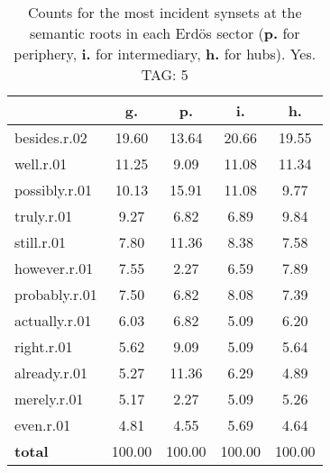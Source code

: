 \begin{table}[h!]
\begin{center}
\begin{tabular}{| l | c | c | c | c |}\hline
 & g. & p. & i. & h. \\\hline
besides.r.02 & 19.60  & 13.64  & 20.66  & 19.55 \\\hline
well.r.01 & 11.25  & 9.09  & 11.08  & 11.34 \\\hline
possibly.r.01 & 10.13  & 15.91  & 11.08  & 9.77 \\\hline
truly.r.01 & 9.27  & 6.82  & 6.89  & 9.84 \\\hline
still.r.01 & 7.80  & 11.36  & 8.38  & 7.58 \\\hline
however.r.01 & 7.55  & 2.27  & 6.59  & 7.89 \\\hline
probably.r.01 & 7.50  & 6.82  & 8.08  & 7.39 \\\hline
actually.r.01 & 6.03  & 6.82  & 5.09  & 6.20 \\\hline
right.r.01 & 5.62  & 9.09  & 5.09  & 5.64 \\\hline
already.r.01 & 5.27  & 11.36  & 6.29  & 4.89 \\\hline
merely.r.01 & 5.17  & 2.27  & 5.09  & 5.26 \\\hline
even.r.01 & 4.81  & 4.55  & 5.69  & 4.64 \\\hline
{{\bf total}} & 100.00  & 100.00  & 100.00  & 100.00 \\\hline
\end{tabular}
\caption{Counts for the most incident synsets at the semantic roots in each Erd\"os sector ({\bf p.} for periphery, {\bf i.} for intermediary, {\bf h.} for hubs). Yes. TAG: 5}
\end{center}
\end{table}